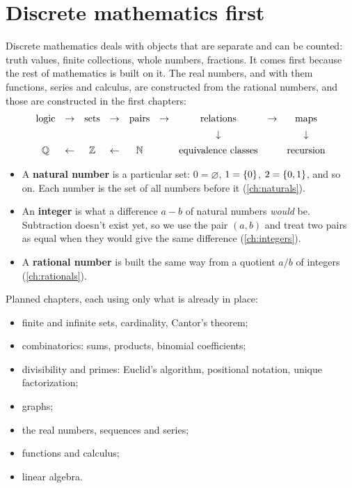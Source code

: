 \section*{Discrete mathematics first}

Discrete mathematics deals with objects that are separate and can be counted:
truth values, finite collections, whole numbers, fractions. It comes first
because the rest of mathematics is built on it. The real numbers, and with them
functions, series and calculus, are constructed from the rational numbers, and
those are constructed in the first chapters:
\[
\begin{array}{ccccccccc}
  \text{logic} & \to & \text{sets} & \to & \text{pairs} & \to &
  \text{relations} & \to & \text{maps} \\[1ex]
  & & & & & & \downarrow & & \downarrow \\[1ex]
  \mathbb{Q} & \leftarrow & \mathbb{Z} & \leftarrow & \mathbb{N} & & \text{equivalence classes}
  & & \text{recursion}
\end{array}
\]
\begin{itemize}
  \item A \textbf{natural number} is a particular set: $0 = \varnothing$, $1 =
    \lbrace 0 \rbrace$, $2 = \lbrace 0, 1 \rbrace$, and so on. Each number is the set of all numbers
    before it (\cref{ch:naturals}).
  \item An \textbf{integer} is what a difference $a - b$ of natural numbers
    \emph{would} be. Subtraction doesn't exist yet, so we use the pair $(a, b)$
    and treat two pairs as equal when they would give the same difference
    (\cref{ch:integers}).
  \item A \textbf{rational number} is built the same way from a quotient $a / b$
    of integers (\cref{ch:rationals}).
\end{itemize}

\noindent Planned chapters, each using only what is already in place:
\begin{itemize}
  \item finite and infinite sets, cardinality, Cantor's theorem;
  \item combinatorics: sums, products, binomial coefficients;
  \item divisibility and primes: Euclid's algorithm, positional notation, unique
    factorization;
  \item graphs;
  \item the real numbers, sequences and series;
  \item functions and calculus;
  \item linear algebra.
\end{itemize}

